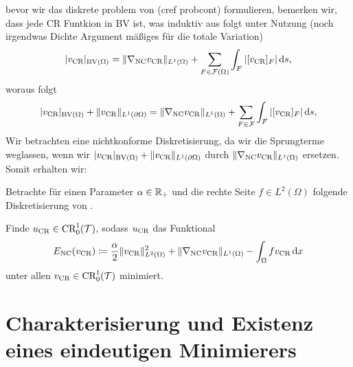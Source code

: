 bevor wir das diskrete problem von (cref probcont) formulieren, bemerken wir,
dass jede CR Funtkion in BV ist, was induktiv aus
\cite[S. 404, Example 10.2.1]{ABM14} folgt unter Nutzung (noch irgendwas
Dichte Argument mäßiges für die totale Variation)
\begin{align*}
  |v_\textup{CR}|_{\textup{BV}(\Omega)} = \Vert \nabla_\textup{NC} v_\textup{CR}\Vert_{L^1(\Omega)} +
  \sum_{F\in\mathcal{F}(\Omega)}\int_F |[v_\textup{CR}]_F|\,\mathrm{d}s,
\end{align*}
woraus folgt
\begin{align*}
  |v_\textup{CR}|_{\textup{BV}(\Omega)} +\Vert v_\textup{CR}\Vert_{L^1(\partial\Omega)} 
  = \Vert \nabla_\textup{NC} v_\textup{CR}\Vert_{L^1(\Omega)} +
  \sum_{F\in\mathcal{F}}\int_F |[v_\textup{CR}]_F|\,\mathrm{d}s,
\end{align*}
Wir betrachten eine nichtkonforme Diskretisierung, da wir die Sprungterme
weglassen, wenn wir 
  $|v_\textup{CR}|_{\textup{BV}(\Omega)} +\Vert v_\textup{CR}\Vert_{L^1(\partial\Omega)}$
durch 
  $\Vert \nabla_\textup{NC} v_\textup{CR}\Vert_{L^1(\Omega)}$ ersetzen.
  Somit erhalten wir:

Betrachte für einen Parameter $\alpha\in\mathbb{R}_+$ und die rechte Seite $f\in
L^2(\Omega)$ folgende Diskretisierung von . 

\begin{problem}\label{prob:discreteProblem}
  Finde $u_\textup{CR}\in \textup{CR}^1_0(\mathcal{T})$,
  sodass $u_\textup{CR}$ das Funktional
  \begin{align}\label{eq:discreteProblem}
    E_\textup{NC}(v_\textup{CR})\coloneqq \frac{\alpha}{2}\Vert v_\textup{CR}\Vert_{L^2(\Omega)}^2
    +\Vert \nabla_\textup{NC}v_\textup{CR}\Vert_{L^1(\Omega)}-\int_\Omega fv_\textup{CR}\,\mathrm{d}x
  \end{align}
  unter allen $v_\textup{CR}\in \textup{CR}^1_0(\mathcal{T})$ minimiert.
\end{problem}

\section{Charakterisierung und Existenz eines eindeutigen Minimierers}

